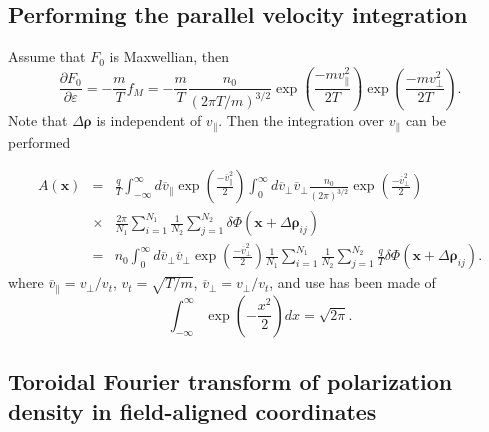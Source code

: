 \documentclass{llncs}
\begin{document}
\subsection{Performing the parallel velocity integration}

Assume that $F_0$ is Maxwellian, then
\begin{equation}
  \frac{\partial F_0}{\partial \varepsilon} = - \frac{m}{T} f_M = -
  \frac{m}{T} \frac{n_0}{(2 \pi T / m)^{3 / 2}} \exp \left( \frac{- m
  v^2_{\parallel}}{2 T} \right) \exp \left( \frac{- m v^2_{\perp}}{2 T}
  \right) .
\end{equation}
Note that $\Delta \mathbf{\rho}$ is independent of $v_{\parallel}$. Then the
integration over $v_{\parallel}$ can be performed


\begin{eqnarray}
  A (\mathbf{x}) & = & \frac{q}{T}  \int_{- \infty}^{\infty} d
  \overline{v}_{\parallel} \exp \left( \frac{- \overline{v}^2_{\parallel}}{2}
  \right) \int_0^{\infty} d \overline{v}_{\perp} \overline{v}_{\perp}
  \frac{n_0}{(2 \pi)^{3 / 2}} \exp \left( \frac{- \overline{v}^2_{\perp}}{2}
  \right) \nonumber\\
  & \times & \frac{2 \pi}{N_1} \sum_{i = 1}^{N_1} \frac{1}{N_2}  \sum_{j =
  1}^{N_2} \delta \Phi (\mathbf{x} + \Delta \mathbf{\rho}_{i j}) \nonumber\\
  & = & n_0  \int_0^{\infty} d \overline{v}_{\perp} \overline{v}_{\perp} \exp
  \left( \frac{- \overline{v}^2_{\perp}}{2} \right) \frac{1}{N_1} \sum_{i =
  1}^{N_1} \frac{1}{N_2}  \sum_{j = 1}^{N_2} \frac{q}{T} \delta \Phi
  (\mathbf{x} + \Delta \mathbf{\rho}_{i j}) .  \label{21-9-16-a5}
\end{eqnarray}
where $\overline{v}_{\parallel} = v_{\perp} / v_t$, $v_t = \sqrt{T / m}$,
$\overline{v}_{\perp} = v_{\perp} / v_t$, and use has been made of
\begin{equation}
  \int_{- \infty}^{\infty} \exp \left( - \frac{x^2}{2} \right) d x = \sqrt{2
  \pi} .
\end{equation}

\subsection{Toroidal Fourier transform of polarization density in
field-aligned coordinates}
\end{document}
